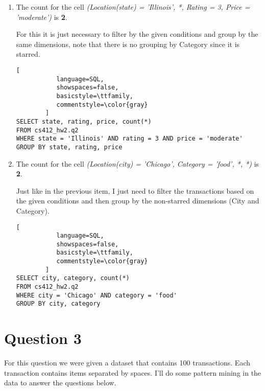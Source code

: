 \documentclass[11pt]{article}
\begin{document}
\begin{enumerate}[label=\alph*.]
\begin{lstlisting}[
           language=SQL,
           showspaces=false,
           basicstyle=\ttfamily,
           commentstyle=\color{gray}
        ]
SELECT count(*) as total
FROM (
  SELECT category, rating, price, count(*) as support
  FROM cs412_hw2.q2
  GROUP BY category, rating, price
) as cuboid
\end{lstlisting}

\item The count for the cell \textit{(Location(state) = 'Illinois', *, Rating = 3, Price = 'moderate')} is \textbf{2}.

For this it is just necessary to filter by the given conditions and group by the same dimensions, note that there is no grouping by Category since it is starred.

\begin{lstlisting}[
           language=SQL,
           showspaces=false,
           basicstyle=\ttfamily,
           commentstyle=\color{gray}
        ]
SELECT state, rating, price, count(*)
FROM cs412_hw2.q2
WHERE state = 'Illinois' AND rating = 3 AND price = 'moderate'
GROUP BY state, rating, price
\end{lstlisting}

\item The count for the cell \textit{(Location(city) = 'Chicago', Category = 'food', *, *)} is \textbf{2}.

Just like in the previous item, I just need to filter the transactions based on the given conditions and then group by the non-starred dimensions (City and Category).

\begin{lstlisting}[
           language=SQL,
           showspaces=false,
           basicstyle=\ttfamily,
           commentstyle=\color{gray}
        ]
SELECT city, category, count(*)
FROM cs412_hw2.q2
WHERE city = 'Chicago' AND category = 'food'
GROUP BY city, category
\end{lstlisting}

\end{enumerate}

\newpage \nocite{*}

\section*{Question 3}
For this question we were given a dataset that contains 100 transactions. Each transaction contains items separated by spaces. I'll do some pattern mining in the data to answer the questions below.
\end{document}
